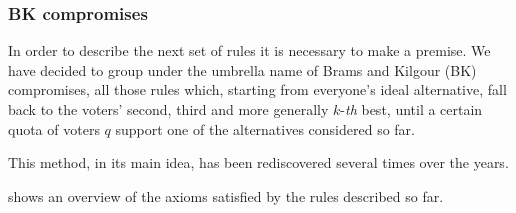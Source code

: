 \subsubsection*{BK compromises}

In order to describe the next set of rules it is necessary to make a premise. We have decided to group under the umbrella name of Brams and Kilgour (BK) compromises, all those rules which, starting from everyone’s ideal alternative, fall back to the voters’ second, third and more generally $k$-\emph{th} best, until a certain quota of voters $q$ support one of the alternatives considered so far.

This method, in its main idea, has been rediscovered several times over the years.


\begin{indented}
\end{indented}

 shows an overview of the axioms satisfied by the rules described so far.

